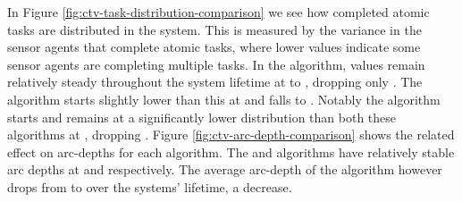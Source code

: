 In Figure \ref{fig:ctv-task-distribution-comparison} we see how completed atomic tasks are distributed in the system. This is measured by the variance in the sensor agents that complete atomic tasks, where lower values indicate some sensor agents are completing multiple tasks. In the \algorithmDistribution{}{} algorithm, values remain relatively steady throughout the system lifetime at \resultsTaskDistDistStart{}{} to \resultsTaskDistDistEnd{}{}, dropping only \resultsTaskDistDistPercent{}{}. The \algorithmQuality{}{} algorithm starts slightly lower than this at \resultsTaskDistQualityStart{}{} and falls \resultsTaskDistQualityPercent{}{} to \resultsTaskDistQualityEnd{}{}. Notably the \algorithmEnergy{}{} algorithm starts and remains at a significantly lower distribution than both these algorithms at \resultsTaskDistEnergyEnd{}{}, dropping \resultsTaskDistEnergydPercent{}{}. Figure
\ref{fig:ctv-arc-depth-comparison} shows the related effect on arc-depths for each algorithm. The \algorithmQuality{}{} and \algorithmDistribution{}{} algorithms have relatively stable arc depths at \resultsArcDepthQualityEnd{}{} and \resultsArcDepthDistEnd{}{} respectively. The average arc-depth of the \algorithmEnergy{}{} algorithm however drops from \resultsArcDepthEnergyStart{}{} to  \resultsArcDepthEnergyEnd{}{} over the systems' lifetime, a \resultsArcDepthEnergyPercent{}{} decrease.

